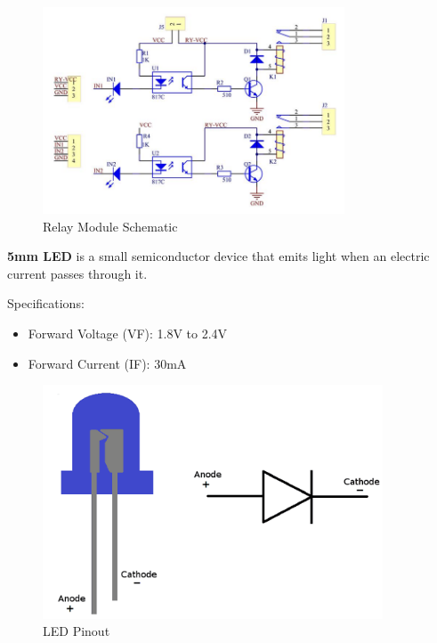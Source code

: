 \documentclass[12pt]{article}
\begin{document}
\begin{figure}[ht]
    \centering
    \includegraphics[width=0.8\textwidth]{images/image1.png}
    \caption{Relay Module Schematic}
    \label{fig:pic17}
\end{figure} 

\newpage

\textbf{5mm LED} is a small semiconductor device that emits light when an electric current passes through it. 

\hspace{1cm}Specifications: 
\begin{itemize}[leftmargin=2cm]
    \item Forward Voltage (VF): 1.8V to 2.4V
    \item Forward Current (IF): 30mA
\end{itemize}

\begin{figure}[ht]
    \centering
    \includegraphics[width=0.9\textwidth]{images/image2.png}
    \caption{LED Pinout}
    \label{fig:pic18}
\end{figure} 
\end{document}
